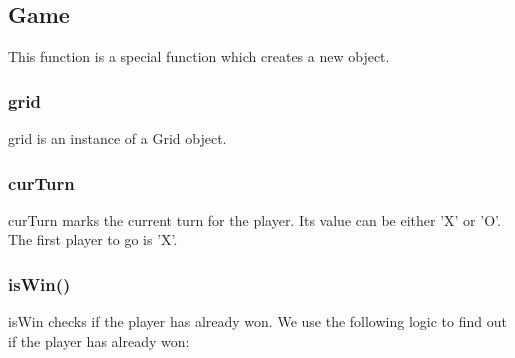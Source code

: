 \documentclass[a4paper]{article}
\begin{document}
\subsection{Game}

This function is a special function which creates a new object.

\subsubsection{grid}

grid is an instance of a Grid object.

\subsubsection{curTurn}

curTurn marks the current turn for the player. Its value can be either 'X' or 'O'. The first player to go is 'X'.

\subsubsection{isWin()}

isWin checks if the player has already won. We use the following logic to find out if the player has already won:

\begin{algorithm}
\end{algorithm}
\end{document}
